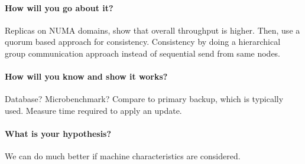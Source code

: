 \documentclass{article}
\begin{document}
\paragraph{How will you go about it?} Replicas on NUMA domains, show
that overall throughput is higher. Then, use a quorum based approach for
consistency. Consistency by doing a hierarchical group communication
approach instead of sequential send from same nodes.

\paragraph{How will you know and show it works?} Database?
Microbenchmark? Compare to primary backup, which is typically
used. Measure time required to apply an update.

\paragraph{What is your hypothesis?} We can do much better if machine
characteristics are considered.


\newpage



\label{LastPage}
\end{document}
